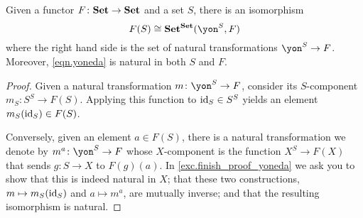 \documentclass[Book-Poly]{subfiles}
\begin{document}
\begin{lemma}\label{lemma.yoneda}
    Given a functor $F\colon\mathbf{Set}\to\mathbf{Set}$ and a set $S$, there is an isomorphism
    \begin{equation}\label{eqn.yoneda}
        F(S)\iso\smset^\smset(\yon^S,F)
    \end{equation}
    where the right hand side is the set of natural transformations $\yon^S\to F$.
    Moreover, \eqref{eqn.yoneda} is natural in both $S$ and $F$.
\end{lemma}
\begin{proof}[Proof]
    Given a natural transformation $m\colon\yon^S\to F$, consider its $S$-component $m_S\colon S^S\to F(S)$.
    Applying this function to $\mathrm{id}_S\in S^S$ yields an element $m_S(\mathrm{id}_S)\in F(S)$.

    Conversely, given an element $a\in F(S)$, there is a natural transformation we denote by $m^a\colon\yon^S\to F$ whose $X$-component is the function $X^S\to F(X)$ that sends $g\colon S\to X$ to $F(g)(a)$.
    In \cref{exc.finish_proof_yoneda} we ask you to show that this is indeed natural in $X$; that these two constructions, $m\mapsto m_S(\mathrm{id}_S)$ and $a\mapsto m^a$, are mutually inverse; and that the resulting isomorphism is natural.
\end{proof}
\end{document}
